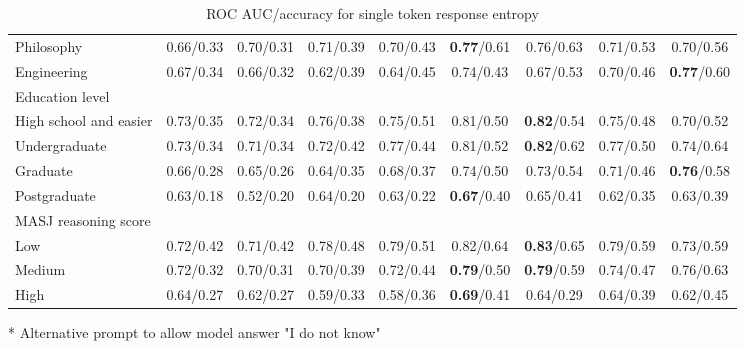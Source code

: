 \begin{table}
{\begin{tabular}{l c c c c c c c c}
Philosophy & 0.66/0.33 & 0.70/0.31 & 0.71/0.39 & 0.70/0.43 & \textbf{0.77}/0.61 & 0.76/0.63 & 0.71/0.53 & 0.70/0.56 \\
Engineering & 0.67/0.34 & 0.66/0.32 & 0.62/0.39 & 0.64/0.45 & 0.74/0.43 & 0.67/0.53 & 0.70/0.46 & \textbf{0.77}/0.60 \\
\hline
Education level \\
\hline
High school and easier & 0.73/0.35 & 0.72/0.34 & 0.76/0.38 & 0.75/0.51 & 0.81/0.50 & \textbf{0.82}/0.54 & 0.75/0.48 & 0.70/0.52 \\
Undergraduate & 0.73/0.34 & 0.71/0.34 & 0.72/0.42 & 0.77/0.44 & 0.81/0.52 & \textbf{0.82}/0.62 & 0.77/0.50 & 0.74/0.64 \\
Graduate & 0.66/0.28 & 0.65/0.26 & 0.64/0.35 & 0.68/0.37 & 0.74/0.50 & 0.73/0.54 & 0.71/0.46 & \textbf{0.76}/0.58 \\
Postgraduate & 0.63/0.18 & 0.52/0.20 & 0.64/0.20 & 0.63/0.22 & \textbf{0.67}/0.40 & 0.65/0.41 & 0.62/0.35 & 0.63/0.39 \\
\hline
MASJ reasoning score \\
\hline
Low & 0.72/0.42 & 0.71/0.42 & 0.78/0.48 & 0.79/0.51 & 0.82/0.64 & \textbf{0.83}/0.65 & 0.79/0.59 & 0.73/0.59 \\
Medium & 0.72/0.32 & 0.70/0.31 & 0.70/0.39 & 0.72/0.44 & \textbf{0.79}/0.50 & \textbf{0.79}/0.59 & 0.74/0.47 & 0.76/0.63 \\
High & 0.64/0.27 & 0.62/0.27 & 0.59/0.33 & 0.58/0.36 & \textbf{0.69}/0.41 & 0.64/0.29 & 0.64/0.39 & 0.62/0.45 \\
\hline
\end{tabular}}
\caption{ROC AUC/accuracy for single token response entropy}
\label{tab:roc_auc_single_token_entropy}
\footnotesize{* Alternative prompt to allow model answer "I do not know"}\\
\end{table}

